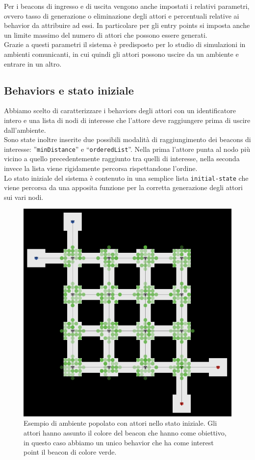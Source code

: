Per i beacons di ingresso e di uscita vengono anche impostati i relativi parametri, ovvero tasso di generazione o eliminazione degli attori e percentuali relative ai behavior da attribuire ad essi. In particolare per gli entry points si imposta anche un limite massimo del numero di attori che possono essere generati.\\
Grazie a questi parametri il sistema è predisposto per lo studio di simulazioni in ambienti comunicanti, in cui quindi gli attori possono uscire da un ambiente e entrare in un altro. 
\subsection{Behaviors e stato iniziale}
Abbiamo scelto di caratterizzare i behaviors degli attori con un identificatore intero e una lista di nodi di interesse che l'attore deve raggiungere prima di uscire dall'ambiente.\\
Sono state inoltre inserite due possibili modalità di raggiungimento dei beacons di interesse: ”\texttt{minDistance}” e “\texttt{orderedList}”. Nella prima l'attore punta al nodo più vicino a quello precedentemente raggiunto tra quelli di interesse, nella seconda invece la lista viene rigidamente percorsa rispettandone l'ordine.\\
Lo stato iniziale del sistema è contenuto in una semplice lista \texttt{initial-state} che viene percorsa da una apposita funzione per la corretta generazione degli attori sui vari nodi. 
\begin{figure}[htbp]
\centering
\includegraphics[width=\textwidth,height=\textheight,keepaspectratio]{images/movers-screen.png}
\caption{Esempio di ambiente popolato con attori nello stato iniziale. Gli attori hanno assunto il colore del beacon che hanno come obiettivo, in questo caso abbiamo un unico behavior che ha come interest point il beacon di colore verde.}
\label{fig:movers-screen}
\end{figure}


